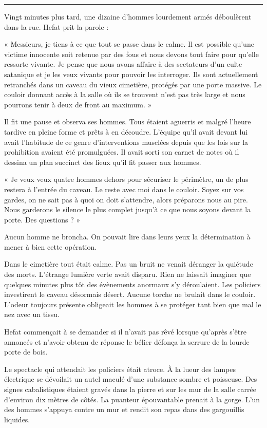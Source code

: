 \documentclass[12pt,a4paper,oneside]{memoir}
\begin{document}
\fancybreak{$* * *$}

Vingt minutes plus tard, une dizaine d'hommes lourdement armés déboulèrent dans la rue. Hefat prit la parole :

« Messieurs, je tiens à ce que tout se passe dans le calme. Il est possible qu'une victime innocente soit retenue par 
des fous et nous devons tout faire pour qu'elle ressorte vivante. Je pense que nous avons affaire à des sectateurs d'un 
culte satanique et je les veux vivants pour pouvoir les interroger. Ils sont actuellement retranchés dans un caveau du 
vieux cimetière, protégés par une porte massive. Le couloir donnant accès à la salle où ils se trouvent n'est pas très 
large et nous pourrons tenir à deux de front au maximum. »

Il fit une pause et observa ses hommes. Tous étaient aguerris et malgré l'heure tardive en pleine forme et prêts à en 
découdre. L'équipe qu'il avait devant lui avait l'habitude de ce genre d'interventions musclées depuis que les lois sur 
la prohibition avaient été promulguées. Il avait sorti son carnet de notes où il dessina un plan succinct des lieux 
qu'il fit passer aux hommes.

« Je veux veux quatre hommes dehors pour sécuriser le périmètre, un de plus restera à l'entrée du caveau. Le reste 
avec moi dans le couloir. Soyez sur vos gardes, on ne sait pas à quoi on doit s'attendre, alors préparons nous au pire. 
Nous garderons le silence le plus complet jusqu'à ce que nous soyons devant la porte. Des questions ? »

Aucun homme ne broncha. On pouvait lire dans leurs yeux la détermination à mener à bien cette opération.

Dans le cimetière tout était calme. Pas un bruit ne venait déranger la quiétude des morts. L'étrange lumière verte 
avait disparu. Rien ne laissait imaginer que quelques minutes plus tôt des évènements anormaux s'y déroulaient. Les 
policiers investirent le caveau désormais désert. Aucune torche ne brulait dans le couloir. L'odeur toujours présente 
obligeait les hommes à se protéger tant bien que mal le nez avec un tissu.

Hefat commençait à se demander si il n'avait pas rêvé lorsque qu'après s'être annoncés et n'avoir obtenu de réponse le 
bélier défonça la serrure de la lourde porte de bois.

Le spectacle qui attendait les policiers était atroce. À la lueur des lampes électrique se dévoilait un autel maculé 
d'une substance sombre et poisseuse. Des signes cabalistiques étaient gravés dans la pierre et sur les mur de la salle 
carrée d'environ dix mètres de côtés. La puanteur épouvantable prenait à la gorge. L'un des hommes s'appuya contre un 
mur et rendit son repas dans des gargouillis liquides.
\end{document}
